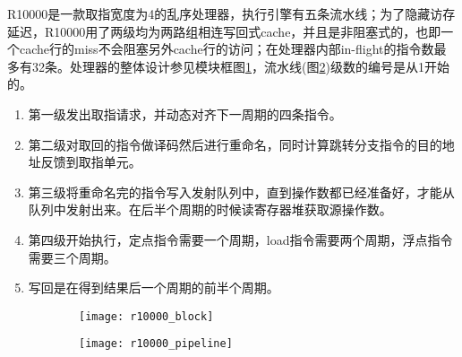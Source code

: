 R10000是一款取指宽度为4的乱序处理器，执行引擎有五条流水线；为了隐藏访存延迟，R10000用了两级均为两路组相连写回式cache，并且是非阻塞式的，也即一个cache行的miss不会阻塞另外cache行的访问；在处理器内部in-flight的指令数最多有32条\citep{MIPS1996}。处理器的整体设计参见模块框图\ref{fig:r10000_block}，流水线(图\ref{fig:r10000_pipeline})级数的编号是从1开始的。
\begin{enumerate}[label=(\arabic*)]
	\item 第一级发出取指请求，并动态对齐下一周期的四条指令。
	\item 第二级对取回的指令做译码然后进行重命名，同时计算跳转分支指令的目的地址反馈到取指单元。
	\item 第三级将重命名完的指令写入发射队列中，直到操作数都已经准备好，才能从队列中发射出来。在后半个周期的时候读寄存器堆获取源操作数。
	\item 第四级开始执行，定点指令需要一个周期，load指令需要两个周期，浮点指令需要三个周期。
	\item 写回是在得到结果后一个周期的前半个周期。
\end{enumerate}
\begin{figure}[!htbp]
\centering
\begin{subfigure}[b]{\textwidth}
	\texttt{[image: r10000\_block]}
	\caption{}
	\label{fig:r10000_block}
\end{subfigure}
\begin{subfigure}[b]{\textwidth}
	\texttt{[image: r10000\_pipeline]}
	\caption{}
	\label{fig:r10000_pipeline}
\end{subfigure}
\label{fig:r10000_total}
\end{figure}

